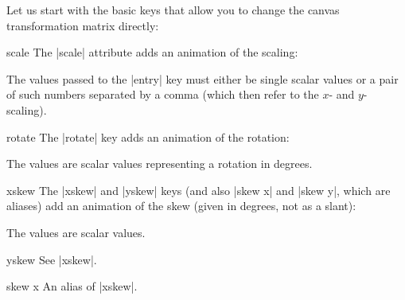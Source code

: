 Let us start with the basic keys that allow you to change the
canvas transformation matrix directly:

\begin{animateattribute}{scale}
  The |scale| attribute adds an animation of the scaling:
\begin{codeexample}[animation list={0.5,1,1.5,2}]
\end{codeexample}
  The values passed to the |entry| key must either be single scalar
  values or a pair of such numbers separated by a comma (which then
  refer to the $x$- and $y$-scaling).
\end{animateattribute}

\begin{animateattribute}{rotate}
  The |rotate| key adds an animation of the rotation:
\begin{codeexample}[animation list={0.5,1,1.5,2}]
\end{codeexample}
  The values are scalar values representing a rotation in degrees.
\end{animateattribute}


\begin{animateattribute}{xskew}
  The |xskew| and |yskew| keys (and also |skew x| and |skew y|,
  which are aliases) add an animation of the skew (given
  in degrees, not as a slant):
\begin{codeexample}[animation list={0.5,1,1.5,2}]
\end{codeexample}
  The values are scalar values.
\end{animateattribute}

\begin{animateattribute}{yskew}
  See |xskew|.
\end{animateattribute}

\begin{animateattribute}{skew x}
  An alias of |xskew|.
\end{animateattribute}

